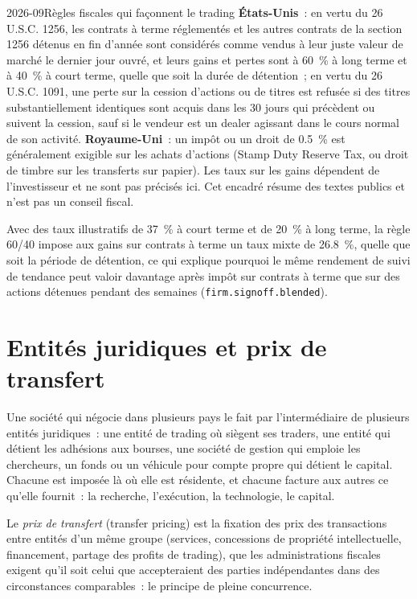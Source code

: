 \begin{dated}{2026-09}{Règles fiscales qui façonnent le trading}\label{dat:fm:finance-product-control-and-tax:tax}
\textbf{États-Unis}~: en vertu du 26 U.S.C. 1256, les contrats à terme réglementés et les autres contrats de la section 1256 détenus en fin d'année sont considérés comme vendus à leur juste
valeur de marché le dernier jour ouvré, et leurs gains et pertes sont à 60~\% à long terme et à 40~\% à court terme, quelle que soit la durée de détention~; en vertu du 26
U.S.C. 1091, une perte sur la cession d'actions ou de titres est refusée si des titres substantiellement identiques sont acquis dans les 30 jours qui précèdent ou
suivent la cession, sauf si le vendeur est un dealer agissant dans le cours normal de son activité. \textbf{Royaume-Uni}~: un impôt ou un droit de 0.5~\% est
généralement exigible sur les achats d'actions (Stamp Duty Reserve Tax, ou droit de timbre sur les transferts sur papier). Les taux sur les gains dépendent de l'investisseur et
ne sont pas précisés ici. Cet encadré résume des textes publics et n'est pas un conseil fiscal.
\end{dated}

Avec des taux illustratifs de 37~\% à court terme et de 20~\% à long terme, la règle 60/40 impose aux gains sur contrats à terme un taux mixte de 26.8~\%, quelle que soit la
période de détention, ce qui explique pourquoi le même rendement de suivi de tendance peut valoir davantage après impôt sur contrats à terme que sur des actions détenues pendant des semaines
(\texttt{firm.signoff.blended}).

\section{Entités juridiques et prix de transfert}

Une société qui négocie dans plusieurs pays le fait par l'intermédiaire de plusieurs entités juridiques~: une entité de trading où siègent ses traders, une entité qui détient
les adhésions aux bourses, une société de gestion qui emploie les chercheurs, un fonds ou un véhicule pour compte propre qui détient le capital. Chacune est imposée
là où elle est résidente, et chacune facture aux autres ce qu'elle fournit~: la recherche, l'exécution, la technologie, le capital.

\begin{definition}\label{def:fm:finance-product-control-and-tax:tp}
Le \emph{prix de transfert} (transfer pricing) est la fixation des prix des transactions entre entités d'un même groupe (services,
concessions de propriété intellectuelle, financement, partage des profits de trading), que les administrations fiscales exigent qu'il soit celui que
accepteraient des parties indépendantes dans des circonstances comparables~: le principe de pleine concurrence.
\end{definition}

